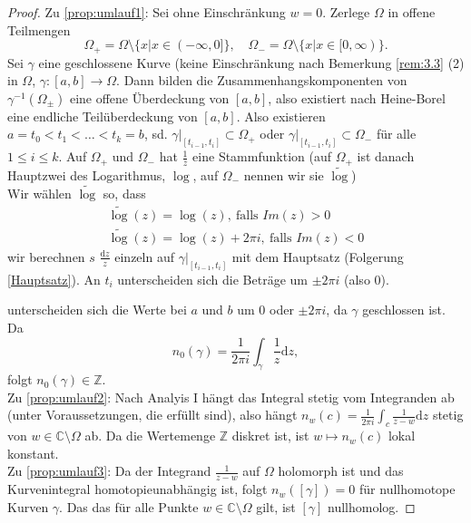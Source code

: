 \documentclass[11pt,titlepage]{article}
\theoremstyle{definition}
\theoremstyle{remark}
\begin{document}
	\begin{proof}
		Zu \ref{prop:umlauf1}: Sei ohne Einschränkung $w=0$. Zerlege $\Omega$ in offene Teilmengen 
		\[\Omega_+ =\Omega\setminus\{ x\vert x\in(-\infty,0]\},\quad \Omega_-=\Omega\setminus
		\{x\vert x\in[0,\infty)\}.\]Sei $\gamma$ eine geschlossene Kurve (keine Einschränkung nach 
		Bemerkung \ref{rem:3.3} (2) in $\Omega$, $\gamma:[a,b]\to\Omega$. Dann bilden die 
		Zusammenhangskomponenten von $\gamma^{-1}(\Omega_{±})$ eine offene Überdeckung 
		von $[a,b]$, also existiert nach Heine-Borel eine endliche Teilüberdeckung von $[a,b]$. 
		Also existieren $a=t_0<t_1<\ldots<t_k=b$, sd. $\gamma|_{[t_{i-1},t_i]}\subset\Omega_+$ oder 
		$\gamma|_{[t_{i-1},t_i]}\subset\Omega_-$ für alle $1\leq i\leq k$. Auf $\Omega_+$ und $\Omega_-$ 
		hat $\frac{1}{z}$ eine Stammfunktion (auf $\Omega_+$ ist danach Hauptzwei des Logarithmus, $\log$, 
		auf $\Omega_-$ nennen wir sie $\tilde{\log}$) \\
		Wir wählen $\tilde{\log}$ so, dass
		\begin{eqnarray*}
			\tilde{\log}(z)=\log(z),\ \text{falls $Im(z)>0$} \\
			\tilde{\log}(z)=\log(z)+2\pi i,\ \text{falls $Im(z)<0$}
		\end{eqnarray*}
		wir berechnen $s$ $\frac{\mathrm{d}z}{z}$ einzeln auf $\gamma|_{[t_{i-1},t_i]}$ mit dem Hauptsatz 
		(Folgerung \ref{Hauptsatz}). An $t_i$ unterscheiden sich die Beträge um $±2\pi i$ (also $0$). 
		
		
		unterscheiden sich die Werte bei $a$ und $b$ um $0$ oder $±2\pi i$, da $\gamma$ geschlossen ist.
		Da \[n_0(\gamma)=\frac{1}{2\pi i}\int_{\gamma} \frac{1}{z}\mathrm{d}z,\]
		folgt $n_0(\gamma)\in\mathbb{Z}$. \\
		
		Zu \ref{prop:umlauf2}: Nach Analyis I hängt das Integral stetig vom Integranden ab (unter 
		Voraussetzungen, die erfüllt sind), also hängt $n_w(c)=\frac{1}{2\pi i} \int_c \frac{1}{z-w}\mathrm{d}z$ 
		stetig von $w\in\mathbb{C}\setminus\Omega$ ab.
		Da die Wertemenge $\mathbb{Z}$ diskret ist, ist $w\mapsto n_w(c)$ lokal konstant. \\
		
		Zu \ref{prop:umlauf3}: Da der Integrand $\frac{1}{z-w}$ auf $\Omega$ holomorph ist und das 
		Kurvenintegral homotopieunabhängig ist, folgt $n_w([\gamma])=0$ für nullhomotope 
		Kurven $\gamma$. Das das für alle Punkte $w\in\mathbb{C}\setminus\Omega$ gilt, ist $[\gamma]$ 
		nullhomolog.
	\end{proof}
	
\end{document}
